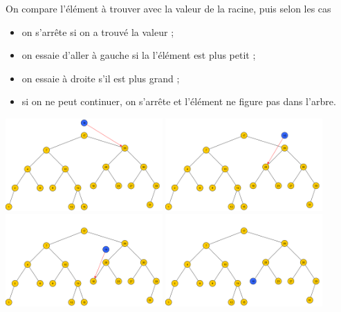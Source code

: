 \documentclass[10pt,firamath,cours]{nsi}
\begin{document}
\begin{methode}
    On compare l'élément à trouver avec la valeur de la racine, puis selon les cas
    \begin{itemize}
        \item on s'arrête si on a trouvé la valeur ;
        \item on essaie d'aller à gauche si la l'élément est plus petit ;
        \item on essaie à droite s'il est plus grand ;
        \item si on ne peut continuer, on s'arrête et l'élément ne figure pas dans l'arbre.
    \end{itemize}
        \includegraphics[width=6cm]{img/Recherche/recherche1} \hspace{2em}
        \includegraphics[width=6cm]{img/Recherche/recherche2}\\ 
        \includegraphics[width=6cm]{img/Recherche/recherche3} \hspace{2em}
        \includegraphics[width=6cm]{img/Recherche/recherche4}
\end{methode}
\end{document}
